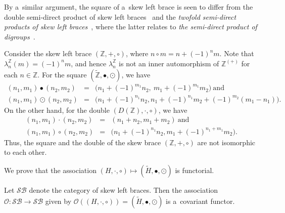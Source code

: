 \documentclass{jonasart}
\theoremstyle{plain}
\begin{document}
	\begin{remark}
		By a~similar argument, the square of a~skew left brace is seen to differ from the double semi-direct product of skew left braces~\cite[Corollary 21]{MR4209715} and the \textit{twofold semi-direct products of skew left braces}~\cite[Proposition 2.1]{MR4950651}, where the latter relates to \textit{the semi-direct product of digroups}~\cite{MR4745565}.
	\end{remark}
	
	\begin{example}
		Consider the skew left brace $(\mathbb{Z}, +, \circ)$, where $n \circ m= n +(-1)^n m$. Note that $\lambda^{\mathbb{Z}}_n (m)=(-1)^{n}m$, and hence $\lambda^{\mathbb{Z}}_n$ is not an inner automorphism of $\mathbb{Z}^{(+)}$ for each $n \in \mathbb{Z}$. For the square $(\widetilde{\mathbb{Z}},\bullet,\odot)$, we have
		\begin{eqnarray*}
			(n_1,m_1 )\bullet (n_2,m_2 )&=&\big(n_1 +(-1)^{m_1}n_2,~m_1 + (-1)^{m_1} m_2\big)~\textrm{and}\\
			(n_1,m_1 )\odot(n_2,m_2 ) &=&\big(n_1 + (-1)^{n_1} n_2, n_1 + (-1)^{n_1}m_2 + (-1)^{ m_2}(m_1 -n_1 )\big).
		\end{eqnarray*}
		On the other hand, for the double $(D(\mathbb{Z}),\cdot,\circ)$, we have
		\begin{eqnarray*}
			(n_1,m_1 ) \cdot (n_2,m_2 )&=&(n_1 +n_2, m_1 +m_2 )~\textrm{and}\\
			(n_1,m_1 )\circ(n_2,m_2 )&=&\big(n_1 + (-1)^{n_1} n_2, m_1 +(-1)^{n_1 +m_1}m_2\big).
		\end{eqnarray*}
		Thus, the square and the double of the skew brace $(\mathbb{Z},+,\circ)$ are not isomorphic to each other.
	\end{example}
	
	We prove that the association $(H,\cdot,\circ) \mapsto (\widetilde{H}, \bullet, \odot)$ is functorial.
	
	\begin{proposition}\label{sb iso to isb iso}
		Let $\mathcal{SB}$ denote the category of skew left braces. Then the association $\mathcal{O}: \mathcal{SB} \to \mathcal{SB}$ given by $\mathcal{O}((H,\cdot,\circ))= (\widetilde{H}, \bullet, \odot)$ is a~covariant functor.
	\end{proposition}
	
\end{document}
